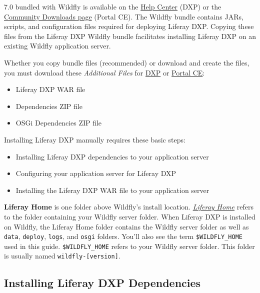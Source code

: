 7.0 bundled with Wildfly is available on the
\href{https://help.liferay.com/hc}{Help Center} (DXP) or the
\href{https://www.liferay.com/downloads-community}{Community Downloads
page} (Portal CE). The Wildfly bundle contains JARs, scripts, and
configuration files required for deploying Liferay DXP. Copying these
files from the Liferay DXP Wildfly bundle facilitates installing Liferay
DXP on an existing Wildfly application server.

Whether you copy bundle files (recommended) or download and create the
files, you must download these \emph{Additional Files} for
\href{https://help.liferay.com/hc}{DXP} or
\href{https://www.liferay.com/downloads-community}{Portal CE}:

\begin{itemize}
\tightlist
\item
  Liferay DXP WAR file
\item
  Dependencies ZIP file
\item
  OSGi Dependencies ZIP file
\end{itemize}

Installing Liferay DXP manually requires these basic steps:

\begin{itemize}
\tightlist
\item
  Installing Liferay DXP dependencies to your application server
\item
  Configuring your application server for Liferay DXP
\item
  Installing the Liferay DXP WAR file to your application server
\end{itemize}

\textbf{Liferay Home} is one folder above Wildfly's install location.
\href{/docs/7-0/deploy/-/knowledge_base/d/installing-product\#liferay-home}{\emph{Liferay
Home}} refers to the folder containing your Wildfly server folder. When
Liferay DXP is installed on Wildfly, the Liferay Home folder contains
the Wildfly server folder as well as \texttt{data}, \texttt{deploy},
\texttt{logs}, and \texttt{osgi} folders. You'll also see the term
\texttt{\$WILDFLY\_HOME} used in this guide. \texttt{\$WILDFLY\_HOME}
refers to your Wildfly server folder. This folder is usually named
\texttt{wildfly-{[}version{]}}.

\subsection{Installing Liferay DXP
Dependencies}\label{installing-liferay-dxp-dependencies-1}

